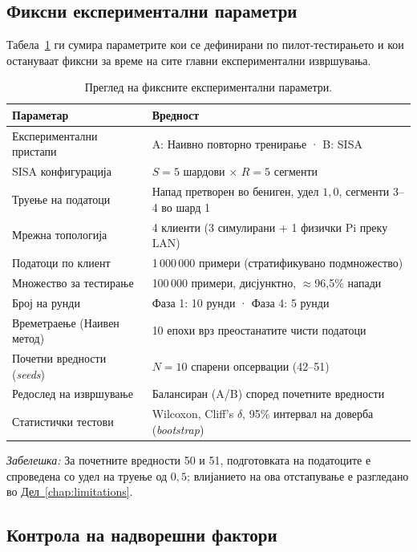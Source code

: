\subsection{Фиксни експериментални параметри}

Табела~\ref{tab:fixed-params} ги сумира параметрите кои се дефинирани по пилот-тестирањето и кои остануваат фиксни за време на сите главни експериментални извршувања.

\begin{table}[htpb]
  \centering
  \caption{Преглед на фиксните експериментални параметри.}
  \label{tab:fixed-params}
  \begin{tabular}{ll}
    \toprule
    \textbf{Параметар} & \textbf{Вредност} \\
    \midrule
    Експериментални пристапи & A: Наивно повторно тренирање · B: SISA \\
    SISA конфигурација & $S=5$ шардови $\times$ $R=5$ сегменти \\
    Труење на податоци & Напад претворен во бениген, удел $1{,}0$, сегменти 3--4 во шард 1 \\
    Мрежна топологија & 4 клиенти (3 симулирани + 1 физички Pi преку LAN) \\
    Податоци по клиент & 1\,000\,000 примери (стратификувано подмножество) \\
    Множество за тестирање & 100\,000 примери, дисјунктно, $\approx$96,5\% напади \\
    Број на рунди & Фаза 1: 10 рунди · Фаза 4: 5 рунди \\
    Времетраење (Наивен метод) & 10 епохи врз преостанатите чисти податоци \\
    Почетни вредности (\emph{seeds}) & $N=10$ спарени опсервации (42--51) \\
    Редослед на извршување & Балансиран (A/B) според почетните вредности \\
    Статистички тестови & Wilcoxon, Cliff's $\delta$, 95\% интервал на доверба (\emph{bootstrap}) \\
    \bottomrule
  \end{tabular}
  \par\medskip
  \footnotesize\raggedright
  \emph{Забелешка:} За почетните вредности 50 и 51, подготовката на податоците е спроведена со удел на труење од $0{,}5$; влијанието на ова отстапување е разгледано во \hyperref[chap:limitations]{Дел~\ref*{chap:limitations}}.
\end{table}

\subsection{Контрола на надворешни фактори}

